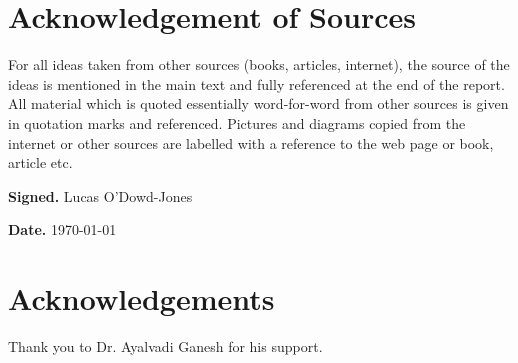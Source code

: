 \documentclass[a4paper,11pt]{report}
\theoremstyle{definition}
\begin{document}




\chapter*{Acknowledgement of Sources}

For all ideas taken from other sources (books, articles, internet),
the source of the ideas is mentioned in the main text and fully
referenced at the end of the report.
All material which is quoted essentially word-for-word from
other sources is given in quotation marks and referenced.
Pictures and diagrams copied from the internet or other sources
are labelled with a reference to the web page or book, article etc.

\noindent
\textbf{Signed. } Lucas O'Dowd-Jones

\noindent
\textbf{Date. } \today

\chapter*{Acknowledgements}

Thank you to Dr. Ayalvadi Ganesh for his support.

\tableofcontents















\printbibliography

\appendix


\end{document}
